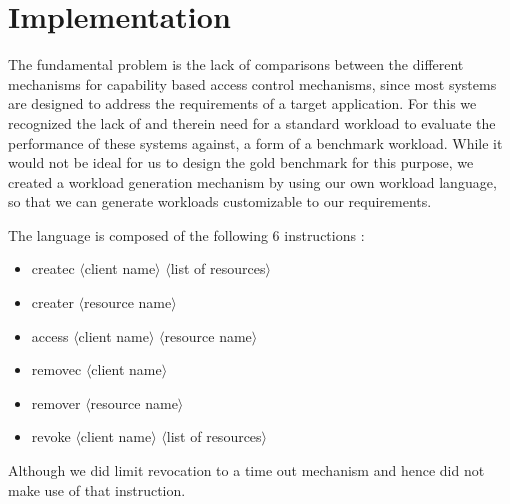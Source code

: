 \section{Implementation}
\label{sec:implementation}

The fundamental problem is the lack of comparisons between the different mechanisms for capability based access control mechanisms, since most systems are designed to address the requirements of a target application. For this we recognized the lack of and therein need for a standard workload to evaluate the performance of these systems against, a form of a benchmark workload. While it would not be ideal for us to design the gold benchmark for this purpose, we created a workload generation mechanism by using our own workload language, so that we can generate workloads customizable to our requirements.

The language is composed of the following 6 instructions :
\begin{itemize}
\item createc $\langle$client name$\rangle$ $\langle$list of resources$\rangle$
\item creater $\langle$resource name$\rangle$
\item access $\langle$client name$\rangle$ $\langle$resource name$\rangle$
\item removec $\langle$client name$\rangle$
\item remover $\langle$resource name$\rangle$
\item revoke $\langle$client name$\rangle$ $\langle$list of resources$\rangle$
\end{itemize}   
Although we did limit revocation to a time out mechanism and hence did not make use of that instruction.

